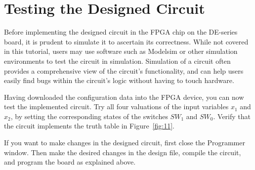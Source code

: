 \section{Testing the Designed Circuit}

Before implementing the designed circuit in the FPGA chip on the DE-series board, it is prudent to simulate it to ascertain its correctness. While not covered in this tutorial, users may use software such as Modelsim or other simulation environments to test the circuit in simulation. Simulation of a circuit often provides a comprehensive view of the circuit's functionality, and can help users easily find bugs within the circuit's logic without having to touch hardware.

Having downloaded the configuration data into the FPGA device, you can now
test the implemented circuit.  Try all four valuations of the input variables
$x_1$ and $x_2$, by setting the corresponding states of the switches
$SW_1$ and $SW_0$. Verify that the circuit implements the truth table
in Figure~\ref{fig:11}.

If you want to make changes in the designed circuit, first close the Programmer window.
Then make the desired changes in the \typeName{} design file, compile the circuit,
and program the board as explained above.
